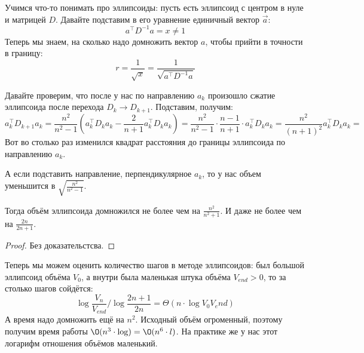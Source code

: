 	Учимся что-то понимать про эллипсоиды: пусть есть эллипсоид с центром в нуле и матрицей $D$.
	Давайте подставим в его уравнение единичный вектор $\vec a$:
	\[ a^{\top} D^{-1} a = x \neq 1 \]
	Теперь мы знаем, на сколько надо домножить вектор $a$, чтобы прийти в точности в границу:
	\[
		r = \frac{1}{\sqrt x} = \frac{1}{\sqrt{a^{\top} D^{-1} a}}
	\]

	Давайте проверим, что после у нас по направлению $a_k$ произошло сжатие эллипсоида после перехода $D_k \to D_{k+1}$.
	Подставим, получим:
	\[
		a_k^\top D_{k+1} a_k = \frac{n^2}{n^2-1}(a_k^\top D_k a_k - \frac{2}{n+1} a_k^\top D_k a_k) =
		\frac{n^2}{n^2-1} \cdot \frac{n-1}{n+1} \cdot a_k^\top D_k a_k =
		\frac{n^2}{(n+1)^2} a_k^\top D_k a_k =
	\]
	Вот во столько раз изменился квадрат расстояния до границы эллипсоида по направлению $a_k$.

	А если подставить направление, перпендикулярное $a_k$, то у нас объем уменьшится в $\sqrt{\frac{n^2}{n^2-1}}$.
	\begin{lemma}
		Тогда объём эллипсоида домножился не более чем на $\frac{n^2}{n^2+1}$.
		И даже не более чем на $\frac{2n}{2n+1}$.
	\end{lemma}
	\begin{proof}
		Без доказательстсва.
	\end{proof}

	Теперь мы можем оценить количество шагов в методе эллипсоидов: был большой эллипсоид объёма $V_0$,
	а внутри была маленькая штука объёма $V_{end}>0$, то за столько шагов сойдётся:
	\[
		\log \frac{V_n}{V_{end}} / \log \frac{2n+1}{2n} = \Theta(n \cdot \log{V_0}{V_end})
	\]
	А время надо домножить ещё на $n^2$.
	Исходный объём огроменный, поэтому получим время работы $\O(n^3 \cdot \log) = \O(n^6 \cdot l)$.
	На практике же у нас этот логарифм отношения объёмов маленький.
